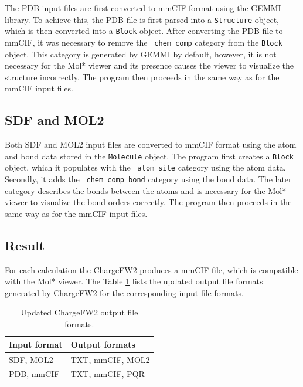 \documentclass[
  digital,     %
  oneside,     %
  nosansbold,  %
  nocolorbold, %
  lof,         %
  lot,         %
]{fithesis4}
\begin{document}
The PDB input files are first converted to mmCIF format using the GEMMI library. To achieve this, the PDB file is first parsed into a \texttt{Structure} object, which is then converted into a \texttt{Block} object. After converting the PDB file to mmCIF, it was necessary to remove the \texttt{\_chem\_comp} category from the \texttt{Block} object. This category is generated by GEMMI by default, however, it is not necessary for the Mol* viewer and its presence causes the viewer to visualize the structure incorrectly. The program then proceeds in the same way as for the mmCIF input files.

\subsection{SDF and MOL2}

Both SDF and MOL2 input files are converted to mmCIF format using the atom and bond data stored in the \texttt{Molecule} object. The program first creates a \texttt{Block} object, which it populates with the \texttt{\_atom\_site} category using the atom data. Secondly, it adds the \texttt{\_chem\_comp\_bond} category using the bond data. The later category describes the bonds between the atoms and is necessary for the Mol* viewer to visualize the bond orders correctly. The program then proceeds in the same way as for the mmCIF input files.

\subsection*{Result}

For each calculation the ChargeFW2 produces a mmCIF file, which is compatible with the Mol* viewer. The Table \ref{table:new_chargefw2_output_formats} lists the updated output file formats generated by ChargeFW2 for the corresponding input file formats.

\begin{table}[htbp]
  \centering
  \begin{tabular}{|l|l|}
    \hline
    \textbf{Input format} & \textbf{Output formats} \\
    \hline
    SDF, MOL2 & TXT, mmCIF, MOL2 \\
    \hline
    PDB, mmCIF & TXT, mmCIF, PQR \\
    \hline
  \end{tabular}
  \caption{Updated ChargeFW2 output file formats.}
  \label{table:new_chargefw2_output_formats}
\end{table}
\end{document}
